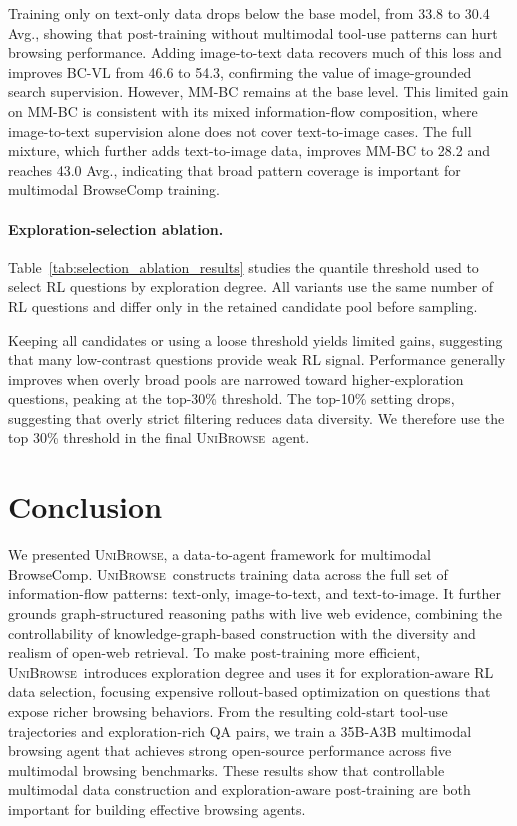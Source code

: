 \documentclass[11pt]{article}
\newcommand{\modelname}{\textsc{UniBrowse}}
\begin{document}


Training only on text-only data drops below the base model, from 33.8 to 30.4 Avg., showing that post-training without multimodal tool-use patterns can hurt browsing performance. Adding image-to-text data recovers much of this loss and improves BC-VL from 46.6 to 54.3, confirming the value of image-grounded search supervision. However, MM-BC remains at the base level. This limited gain on MM-BC is consistent with its mixed information-flow composition, where image-to-text supervision alone does not cover text-to-image cases. The full mixture, which further adds text-to-image data, improves MM-BC to 28.2 and reaches 43.0 Avg., indicating that broad pattern coverage is important for multimodal BrowseComp training.

\paragraph{Exploration-selection ablation.}
Table~\ref{tab:selection_ablation_results} studies the quantile threshold used to select RL questions by exploration degree. All variants use the same number of RL questions and differ only in the retained candidate pool before sampling.


Keeping all candidates or using a loose threshold yields limited gains, suggesting that many low-contrast questions provide weak RL signal. Performance generally improves when overly broad pools are narrowed toward higher-exploration questions, peaking at the top-30\% threshold. The top-10\% setting drops, suggesting that overly strict filtering reduces data diversity. We therefore use the top 30\% threshold in the final \modelname\ agent.

\section{Conclusion}
We presented \modelname, a data-to-agent framework for multimodal BrowseComp.
\modelname\ constructs training data across the full set of information-flow patterns: text-only, image-to-text, and text-to-image.
It further grounds graph-structured reasoning paths with live web evidence, combining the controllability of knowledge-graph-based construction with the diversity and realism of open-web retrieval.
To make post-training more efficient, \modelname\ introduces exploration degree and uses it for exploration-aware RL data selection, focusing expensive rollout-based optimization on questions that expose richer browsing behaviors.
From the resulting cold-start tool-use trajectories and exploration-rich QA pairs, we train a 35B-A3B multimodal browsing agent that achieves strong open-source performance across five multimodal browsing benchmarks.
These results show that controllable multimodal data construction and exploration-aware post-training are both important for building effective browsing agents. 
\end{document}
